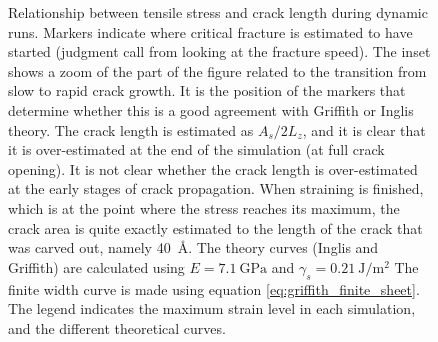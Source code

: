 \begin{figure}
\caption{Relationship between tensile stress and crack length during dynamic runs. Markers indicate where critical fracture is estimated to have started (judgment call from looking at the fracture speed). The inset shows a zoom of the part of the figure related to the transition from slow to rapid crack growth. It is the position of the markers that determine whether this is a good agreement with Griffith or Inglis theory. The crack length is estimated as $A_s/2L_z$, and it is clear that it is over-estimated at the end of the simulation (at full crack opening). It is not clear whether the crack length is over-estimated at the early stages of crack propagation. When straining is finished, which is at the point where the stress reaches its maximum, the crack area is quite exactly estimated to the length of the crack that was carved out, namely \SI{40}{\angstrom}. The theory curves (Inglis and Griffith) are calculated using $E=\SI{7.1}{\giga\pascal}$ and $\gamma_s = \SI{0.21}{\joule\per\meter\squared}$ The finite width curve is made using equation \ref{eq:griffith_finite_sheet}. The legend indicates the maximum strain level in each simulation, and the different theoretical curves.}
\label{fig:fracture_theory_compare}
\end{figure}